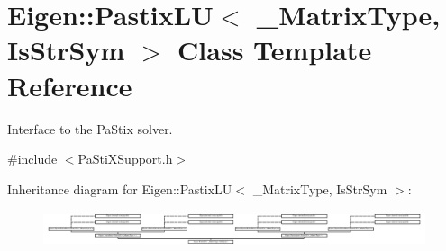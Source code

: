 \hypertarget{class_eigen_1_1_pastix_l_u}{}\section{Eigen\+:\+:Pastix\+LU$<$ \+\_\+\+Matrix\+Type, Is\+Str\+Sym $>$ Class Template Reference}
\label{class_eigen_1_1_pastix_l_u}


Interface to the Pa\+Stix solver.  




{\ttfamily \#include $<$Pa\+Sti\+X\+Support.\+h$>$}

Inheritance diagram for Eigen\+:\+:Pastix\+LU$<$ \+\_\+\+Matrix\+Type, Is\+Str\+Sym $>$\+:\begin{figure}[H]
\begin{center}
\leavevmode
\includegraphics[height=1.063830cm]{class_eigen_1_1_pastix_l_u}
\end{center}
\end{figure}
